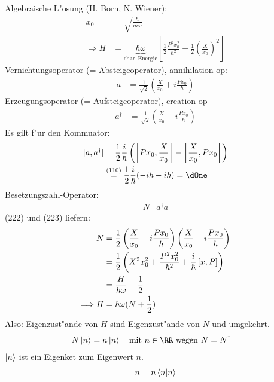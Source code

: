 \documentclass[a4paper]{scrartcl}
\begin{document}
{Algebraische L"osung (H. Born, N. Wiener):
\begin{align}
x_0 & = \sqrt {\frac{\hbar}{m \omega}} \\
\Longrightarrow H & = \underbrace{\hbar \omega}_{\mathrm{char. \  Energie}} \left[ \frac 12 \frac{P^2 x_0^2}{\hbar^2} + \frac 12 \left( \frac X {x_0} \right)^2 \right]
\end{align}
Vernichtungsoperator (= Absteigeoperator), annihilation op:
\begin{align}
a & = \frac1 {\sqrt 2} \left( \frac X {x_0} + i \frac {P x_0}{\hbar} \right)
\end{align}
Erzeugungsoperator (= Aufsteigeoperator), creation op
\begin{align}
a^\dagger & = \frac1 {\sqrt 2} \left( \frac X {x_0} - i \frac {P x_0}{\hbar} \right)
\end{align}
Es gilt f"ur den Kommuator:
\begin{align}
\begin{split}
[a, a^\dagger] & = \frac 12 \frac i \hbar \left( \left[ P x_0, \frac X {x_0} \right] - \left[ \frac X {x_0}, P x_0 \right] \right) \\
& \stackrel{(110)}= \frac 12 \frac i \hbar ( - i \hbar - i \hbar) = \dOne
\end{split}
\end{align}
Besetzungszahl-Operator: 
\begin{align}
N &  a^\dagger a
\end{align}
(222) und (223) liefern:
\begin{align}
N & = \frac 12 \left( \frac X {x_0} - i \frac {P x_0} \hbar \right) \left( \frac X {x_0} + i \frac{P x_0} \hbar \right) \notag \\
& = \frac 12 \left( X^2 {x_0^2} + \frac{P^2 x_0^2}{\hbar^2} + \frac i \hbar \left[ x, P \right] \right)  \notag \\
& = \frac H {\hbar \omega} - \frac12 \notag \\
\Longrightarrow H & = \hbar \omega ( N + \frac 12)
\end{align}
Also: Eigenzust"ande von $H$ sind Eigenzust"ande von $N$ und umgekehrt.
\begin{align}
N \ket n & = n \ket n \quad \mathrm{mit \ } n \in \RR \mathrm{ \ wegen \ } N = N^\dagger
\end{align}
$\ket n $ ist ein Eigenket zum Eigenwert $n$.
\begin{align}
\begin{split}
n & = n \braket {n | n } \\

\end{split}
\end{align}}
\end{document}
